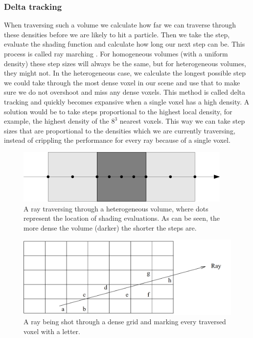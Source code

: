 \subsubsection{Delta tracking} \label{related_work:path_traced_volume_rendering:delta_tracking}
When traversing such a volume we calculate how far we can traverse through these densities before we are likely to hit a particle. Then we take the step, evaluate the shading function and calculate how long our next step can be. This process is called ray marching \cite{RenderingWithTwoTriangles}. For homogeneous volumes (with a uniform density) these step sizes will always be the same, but for heterogeneous volumes, they might not. In the heterogeneous case, we calculate the longest possible step we could take through the most dense voxel in our scene and use that to make sure we do not overshoot and miss any dense voxels. This method is called delta tracking \cite{kutz2017spectral} and quickly becomes expansive when a single voxel has a high density. A solution would be to take steps proportional to the highest local density, for example, the highest density of the $8^3$ nearest voxels. This way we can take step sizes that are proportional to the densities which we are currently traversing, instead of crippling the performance for every ray because of a single voxel.

\begin{figure}[H]
    \centering
    \includegraphics[width=0.9\linewidth]{figures/sample_step_size.png}
    \caption{A ray traversing through a heterogeneous volume, where dots represent the location of shading evaluations. As can be seen, the more dense the volume (darker) the shorter the steps are.}
    \label{fig:sample_step_size}
\end{figure}

\begin{figure}
    \centering
    \includegraphics[width=\linewidth]{figures/dda.png}
    \caption{A ray being shot through a dense grid and marking every traversed voxel with a letter. \cite{amanatides1987fast}}
    \label{fig:dda_traversal}
\end{figure}

